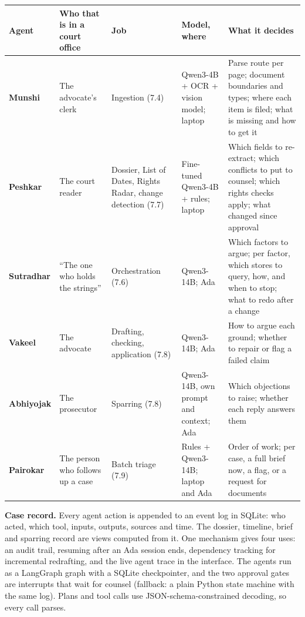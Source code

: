 \documentclass[10pt,a4paper]{article}
\begin{document}
{\small
\begin{xltabular}{\linewidth}{@{}>{\raggedright\arraybackslash{}\hsize}X>{\raggedright\arraybackslash{}\hsize}X>{\raggedright\arraybackslash{}\hsize}X>{\raggedright\arraybackslash{}\hsize}X>{\raggedright\arraybackslash{}\hsize}X@{}}
\toprule
\textbf{Agent} & \textbf{Who that is in a court office} & \textbf{Job} & \textbf{Model, where} & \textbf{What it decides} \\
\midrule
\endhead
\textbf{Munshi} & The advocate's clerk & Ingestion (7.4) & Qwen3-4B + OCR + vision model; laptop & Parse route per page; document boundaries and types; where each item is filed; what is missing and how to get it \\
\textbf{Peshkar} & The court reader & Dossier, List of Dates, Rights Radar, change detection (7.7) & Fine-tuned Qwen3-4B + rules; laptop & Which fields to re-extract; which conflicts to put to counsel; which rights checks apply; what changed since approval \\
\textbf{Sutradhar} & ``The one who holds the strings'' & Orchestration (7.6) & Qwen3-14B; Ada & Which factors to argue; per factor, which stores to query, how, and when to stop; what to redo after a change \\
\textbf{Vakeel} & The advocate & Drafting, checking, application (7.8) & Qwen3-14B; Ada & How to argue each ground; whether to repair or flag a failed claim \\
\textbf{Abhiyojak} & The prosecutor & Sparring (7.8) & Qwen3-14B, own prompt and context; Ada & Which objections to raise; whether each reply answers them \\
\textbf{Pairokar} & The person who follows up a case & Batch triage (7.9) & Rules + Qwen3-14B; laptop and Ada & Order of work; per case, a full brief now, a flag, or a request for documents \\
\bottomrule
\end{xltabular}}

\textbf{Case record.} Every agent action is appended to an event log in SQLite: who acted, which tool, inputs, outputs, sources and time. The dossier, timeline, brief and sparring record are views computed from it. One mechanism gives four uses: an audit trail, resuming after an Ada session ends, dependency tracking for incremental redrafting, and the live agent trace in the interface. The agents run as a LangGraph graph with a SQLite checkpointer, and the two approval gates are interrupts that wait for counsel (fallback: a plain Python state machine with the same log). Plans and tool calls use JSON-schema-constrained decoding, so every call parses.
\end{document}
